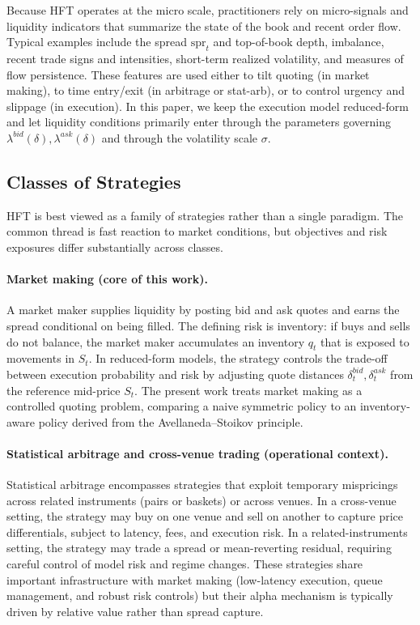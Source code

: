Because HFT operates at the micro scale, practitioners rely on micro-signals and liquidity indicators that summarize the state of the book and recent order flow. Typical examples include the spread $\mathrm{spr}_t$ and top-of-book depth, imbalance, recent trade signs and intensities, short-term realized volatility, and measures of flow persistence. These features are used either to tilt quoting (in market making), to time entry/exit (in arbitrage or stat-arb), or to control urgency and slippage (in execution). In this paper, we keep the execution model reduced-form and let liquidity conditions primarily enter through the parameters governing $\lambda^{bid}(\delta),\lambda^{ask}(\delta)$ and through the volatility scale $\sigma$.

\subsection{Classes of Strategies}
HFT is best viewed as a family of strategies rather than a single paradigm. The common thread is fast reaction to market conditions, but objectives and risk exposures differ substantially across classes.

\paragraph{Market making (core of this work).}
A market maker supplies liquidity by posting bid and ask quotes and earns the spread conditional on being filled. The defining risk is inventory: if buys and sells do not balance, the market maker accumulates an inventory $q_t$ that is exposed to movements in $S_t$. In reduced-form models, the strategy controls the trade-off between execution probability and risk by adjusting quote distances $\delta_t^{bid},\delta_t^{ask}$ from the reference mid-price $S_t$. The present work treats market making as a controlled quoting problem, comparing a naive symmetric policy to an inventory-aware policy derived from the Avellaneda--Stoikov principle.

\paragraph{Statistical arbitrage and cross-venue trading (operational context).}
Statistical arbitrage encompasses strategies that exploit temporary mispricings across related instruments (pairs or baskets) or across venues. In a cross-venue setting, the strategy may buy on one venue and sell on another to capture price differentials, subject to latency, fees, and execution risk. In a related-instruments setting, the strategy may trade a spread or mean-reverting residual, requiring careful control of model risk and regime changes. These strategies share important infrastructure with market making (low-latency execution, queue management, and robust risk controls) but their alpha mechanism is typically driven by relative value rather than spread capture.

